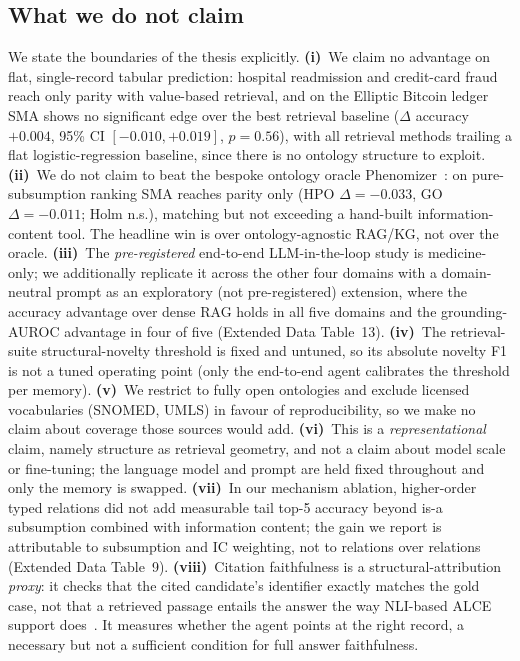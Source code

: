 \documentclass[pdflatex,sn-nature]{sn-jnl}
\begin{document}
\subsection{What we do not claim}
 We state the boundaries of the thesis
explicitly. \textbf{(i)}~We claim no advantage on flat, single-record
tabular prediction: hospital readmission and credit-card fraud reach only
parity with value-based retrieval, and on the Elliptic Bitcoin
ledger~\cite{weber2019elliptic} SMA shows no significant edge over the best
retrieval baseline ($\Delta$ accuracy $+0.004$, 95\% CI $[-0.010,+0.019]$,
$p{=}0.56$), with all retrieval methods trailing a flat logistic-regression
baseline, since there is no ontology structure to exploit.
\textbf{(ii)}~We do not claim to beat the bespoke ontology oracle
Phenomizer~\cite{kohler2009phenomizer}: on pure-subsumption ranking SMA
reaches parity only (HPO $\Delta{=}{-}0.033$, GO $\Delta{=}{-}0.011$; Holm
n.s.), matching but not exceeding a hand-built information-content tool. The
headline win is over ontology-agnostic RAG/KG, not over the oracle.
\textbf{(iii)}~The \emph{pre-registered} end-to-end LLM-in-the-loop study is
medicine-only; we additionally replicate it across the other four domains with a
domain-neutral prompt as an exploratory (not pre-registered) extension, where the
accuracy advantage over dense RAG holds in all five domains and the grounding-AUROC
advantage in four of five (Extended Data Table~13).
\textbf{(iv)}~The retrieval-suite structural-novelty threshold is fixed and
untuned, so its absolute novelty F1 is not a tuned operating point (only the
end-to-end agent calibrates the threshold per memory).
\textbf{(v)}~We restrict to fully open ontologies and exclude licensed
vocabularies (SNOMED, UMLS) in favour of reproducibility, so we make no claim
about coverage those sources would add.
\textbf{(vi)}~This is a \emph{representational} claim, namely structure as
retrieval geometry, and not a claim about model scale or fine-tuning; the language
model and prompt are held fixed throughout and only the memory is swapped.
\textbf{(vii)}~In our mechanism ablation, higher-order typed relations did not
add measurable tail top-5 accuracy beyond is-a subsumption combined with
information content; the gain we report is attributable to subsumption and
IC weighting, not to relations over relations (Extended Data Table~9).
\textbf{(viii)}~Citation faithfulness is a structural-attribution \emph{proxy}: it
checks that the cited candidate's identifier exactly matches the gold case, not
that a retrieved passage entails the answer the way NLI-based ALCE support
does~\cite{gao2023alce}. It measures whether the agent points at the right record,
a necessary but not a sufficient condition for full answer faithfulness.
\end{document}
